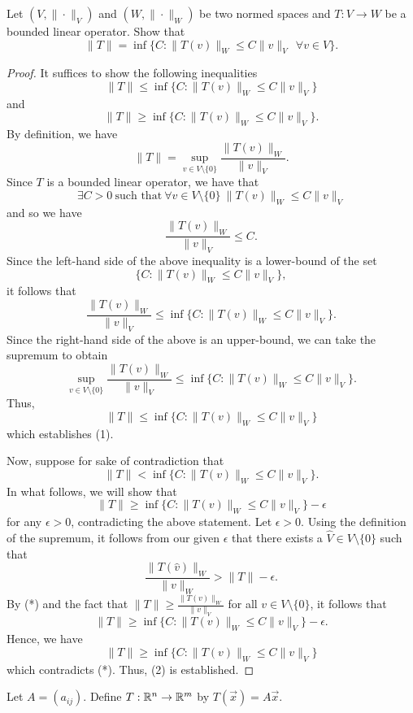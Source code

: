 \documentclass[a4paper]{article}
\begin{document}
\begin{problem}
    Let \( (V, \|\cdot\|_V) \) and \( (W, \|\cdot\|_W) \) be two normed spaces and \( T: V \to W  \) be a bounded linear operator. Show that 
    \[  \|T\| = \inf \{ C : \|T(v)\|_W \leq C \|v\|_V \ \ \forall v \in V \}.  \]
\end{problem}
\begin{proof}
    It suffices to show the following inequalities
\[ \|T\| \leq \inf \{ C : \|T(v)\|_{W} \leq C \|v\|_{V} \} \tag{1} \]
and 
\[  \|T\| \geq \inf \{ C: \|T(v)\|_{W} \leq C \|v\|_{V} \}. \tag{2} \]
By definition, we have 
\[  \|T\| = \sup_{v \in V \setminus  \{ 0 \} } \frac{ \|T(v)\|_{W} }{ \|v\|_{V} }. \]
Since \( T  \) is a bounded linear operator, we have that
\[  \exists C > 0 \ \text{such that} \ \forall v \in V \setminus  \{ 0  \}  \ \|T(v)\|_{W} \leq C \|v\|_{V}  \]
and so we have
\[  \frac{ \|T(v)\|_{W} }{ \|v\|_{V} }  \leq C. \]
Since the left-hand side of the above inequality is a lower-bound of the set 
\[  \{ C: \|T(v)\|_{W} \leq C \|v\|_{V} \},  \]
it follows that 
\[  \frac{ \|T(v)\|_{W} }{ \|v\|_{V} }  \leq \inf \{ C: \|T(v)\|_{W} \leq C \|v\|_{V} \}. \]
Since the right-hand side of the above is an upper-bound, we can take the supremum to obtain
\[  \sup_{v \in V \setminus  \{ 0 \} } \frac{ \|T(v)\|_{W} }{ \|v\|_{V} } \leq \inf \{ C : \|T(v)\|_{W} \leq C \|v\|_{V} \}.  \]
Thus, 
\[  \|T\| \leq \inf \{ C : \|T(v)\|_{W} \leq C \|v\|_V \} \]
which establishes (1).

Now, suppose for sake of contradiction that 
\[  \|T\| < \inf \{ C : \|T(v)\|_{W} \leq C \|v\|_{V} \}. \tag{*}  \]
In what follows, we will show that 
\[  \|T\| \geq \inf \{ C : \|T(v)\|_{W} \leq C \|v\|_V \} - \epsilon \]
for any \( \epsilon > 0  \), contradicting the above statement.
Let \( \epsilon > 0  \). Using the definition of the supremum, it follows from our given \( \epsilon  \) that there exists a \( \hat{V} \in V \setminus  \{ 0  \}   \) such that 
\[  \frac{ \|T(\hat{v})\|_W }{  \|v \|_W } > \|T\| - \epsilon.  \]
By (*) and the fact that \( \|T\| \geq \frac{ \|T(v)\|_W }{ \|v\|_V }  \) for all \( v \in V \setminus  \{ 0 \}  \), it follows that 
    \[  \|T\| \geq \inf \{ C : \|T(v)\|_W \leq C \|v\|_V \} - \epsilon. \]
    Hence, we have
    \[  \|T\| \geq \inf  \{ C : \|T(v)\|_W \leq C \|v\|_V \}   \]
    which contradicts (*). Thus, (2) is established.
\end{proof}


\begin{problem}
    Let \( A = ({a}_{ij}) \). Define \( T: \mathbb{R}^{n} \to \mathbb{R}^{m} \) by \( T(\vec{x}) = A \vec{x} \).
\end{problem}
\end{document}
